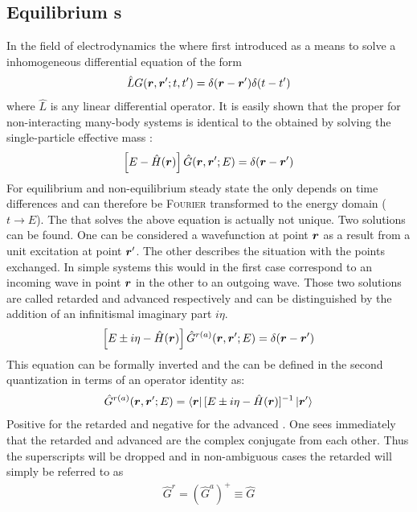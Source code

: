 \subsection{Equilibrium \cgfnc s}
In the field of electrodynamics the \gfnc{} where first introduced as a means to solve a inhomogeneous differential equation of the form
\begin{align}
\hat{L}G(\boldsymbol{r},\boldsymbol{r}';t,t') = \delta(\boldsymbol{r}-\boldsymbol{r}')\delta(t-t')
\label{eqn:lineardiff}
\end{align}
where $\hat{L}$ is any linear differential operator. It  is easily shown that the proper \gfnc{} for non-interacting many-body systems is identical to the \gfnc{} obtained by solving the single-particle effective mass \sdg{} \cite{ferry1999transport}:
\begin{align}
\left[ E -\hat{H}(\boldsymbol{r})\right] \hat{G}(\boldsymbol{r},\boldsymbol{r}';E) = \delta (\boldsymbol{r}-\boldsymbol{r}')
\end{align}
For equilibrium \cite{fetter2003quantum} and non-equilibrium steady state \cite{haug2008quantum} the \gfnc{} only depends on time differences and can therefore be \textsc{Fourier} transformed to the energy domain ($t \rightarrow E$). The \gfnc{} that solves the above equation is actually not unique. Two solutions can be found. One can be considered a wavefunction at point $\boldsymbol{r}$ as a result from a unit excitation at point $\boldsymbol{r}'$. The other describes the situation with the points exchanged. In simple systems this would in the first case correspond to an incoming wave in point $\boldsymbol{r}$ in the other to an outgoing wave.
Those two solutions are called retarded and advanced \gfnc{} respectively and can be distinguished by the addition of an infinitismal imaginary part $i\eta$.
\begin{align}
\left[ E \pm i \eta -\hat{H}(\boldsymbol{r})\right] \hat{G}^{r(a)}(\boldsymbol{r},\boldsymbol{r}';E) = \delta (\boldsymbol{r}-\boldsymbol{r}')
\end{align}
This equation can be formally inverted and the \gfnc{} can be defined in the second quantization in terms of an operator identity as:
\begin{align}
\hat{G}^{r(a)}(\boldsymbol{r},\boldsymbol{r}';E) = \left< \boldsymbol{r} \right| [E\pm i \eta - \hat{H}(\boldsymbol{r})]^{-1} \left| \boldsymbol{r}' \right>
\end{align}
Positive for the retarded and negative for the advanced \gfnc{}. One sees immediately that the retarded and advanced \gfnc{} are the complex conjugate from each other. Thus the superscripts will be dropped and in non-ambiguous cases the retarded \gfnc{} will simply be referred to as \gfnc{}
\begin{align}
\hat{G}^r = (\hat{G}^a)^+ \equiv \hat{G}
\end{align}
